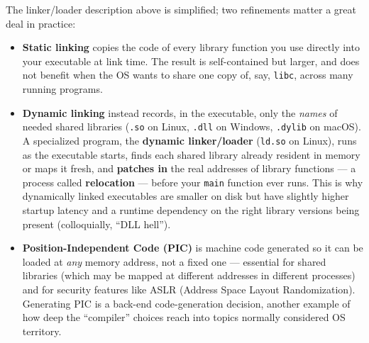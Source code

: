 \documentclass[full-course-notes.tex]{subfiles}
\begin{document}
\begin{enrichment}
The linker/loader description above is simplified; two refinements matter a great deal in
practice:
\begin{itemize}
  \item \textbf{Static linking} copies the code of every library function you use directly into
  your executable at link time. The result is self-contained but larger, and does not benefit
  when the OS wants to share one copy of, say, \texttt{libc}, across many running programs.
  \item \textbf{Dynamic linking} instead records, in the executable, only the \emph{names} of
  needed shared libraries (\texttt{.so} on Linux, \texttt{.dll} on Windows, \texttt{.dylib} on
  macOS). A specialized program, the \textbf{dynamic linker/loader} (\texttt{ld.so} on Linux),
  runs as the executable starts, finds each shared library already resident in memory or maps it
  fresh, and \textbf{patches in} the real addresses of library functions --- a process called
  \textbf{relocation} --- before your \texttt{main} function ever runs. This is why dynamically
  linked executables are smaller on disk but have slightly higher startup latency and a runtime
  dependency on the right library versions being present (colloquially, ``DLL hell'').
  \item \textbf{Position-Independent Code (PIC)} is machine code generated so it can be loaded
  at \emph{any} memory address, not a fixed one --- essential for shared libraries (which may be
  mapped at different addresses in different processes) and for security features like ASLR
  (Address Space Layout Randomization). Generating PIC is a back-end code-generation decision,
  another example of how deep the ``compiler'' choices reach into topics normally considered OS
  territory.
\end{itemize}
\end{enrichment}
\end{document}
